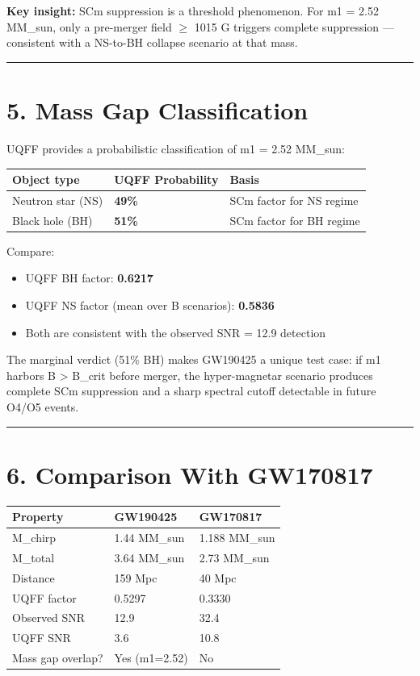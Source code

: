 \documentclass[11pt]{article}
\begin{document}
\textbf{Key insight:} SCm suppression is a threshold phenomenon. For m1 = 2.52 MM\_sun, only a pre-merger field $\geq$ 1015 G triggers complete suppression --- consistent with a NS-to-BH collapse scenario at that mass.

\noindent\rule{\textwidth}{0.4pt}

\section*{5. Mass Gap Classification}

UQFF provides a probabilistic classification of m1 = 2.52 MM\_sun:

\begin{center}
\begin{longtable}{lll}
\toprule
Object type & UQFF Probability & Basis \tabularnewline
\midrule
\endhead
Neutron star (NS) & \textbf{49\%} & SCm factor for NS regime \tabularnewline
Black hole (BH) & \textbf{51\%} & SCm factor for BH regime \tabularnewline
\bottomrule
\end{longtable}
\end{center}

Compare:

\begin{itemize}
  \item UQFF BH factor: \textbf{0.6217}
  \item UQFF NS factor (mean over B scenarios): \textbf{0.5836}
  \item Both are consistent with the observed SNR = 12.9 detection
\end{itemize}

The marginal verdict (51\% BH) makes GW190425 a unique test case: if m1 harbors B > B\_crit before merger, the hyper-magnetar scenario produces complete SCm suppression and a sharp spectral cutoff detectable in future O4/O5 events.

\noindent\rule{\textwidth}{0.4pt}

\section*{6. Comparison With GW170817}

\begin{center}
\begin{longtable}{lll}
\toprule
Property & GW190425 & GW170817 \tabularnewline
\midrule
\endhead
M\_chirp & 1.44 MM\_sun & 1.188 MM\_sun \tabularnewline
M\_total & 3.64 MM\_sun & 2.73 MM\_sun \tabularnewline
Distance & 159 Mpc & 40 Mpc \tabularnewline
UQFF factor & 0.5297 & 0.3330 \tabularnewline
Observed SNR & 12.9 & 32.4 \tabularnewline
UQFF SNR & 3.6 & 10.8 \tabularnewline
Mass gap overlap? & Yes (m1=2.52) & No \tabularnewline
\bottomrule
\end{longtable}
\end{center}
\end{document}
